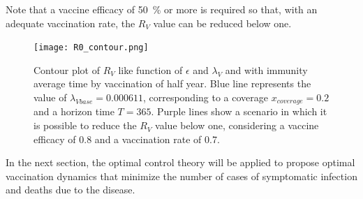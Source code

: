 Note that a vaccine efficacy of \SI{50}{\percent} or more is
required so that, with an adequate vaccination rate, the $R_V$
value can be reduced below one.

\begin{figure}[!h]
    \centering
    \texttt{[image: R0\_contour.png]}
    \caption{
        Contour plot  of $R_V$ like function of $ \epsilon $
        and $ \lambda_V $ and with immunity average time by
        vaccination of half year. Blue line represents the value of
        $\lambda_{Vbase} = \num{0.000611}$,
        corresponding to a coverage $x_{coverage}=0.2$ and a
        horizon time $T=365$.
        Purple lines show a scenario in which it is possible to
        reduce the $R_V$ value below one, considering a vaccine
        efficacy of \num{0.8} and a vaccination rate of \num{0.7}.
    }
    \label{R0_contour}
\end{figure}

    In the next section, the optimal control theory will be applied
to propose optimal vaccination dynamics that minimize the
number of cases of symptomatic infection and deaths due to the
disease.